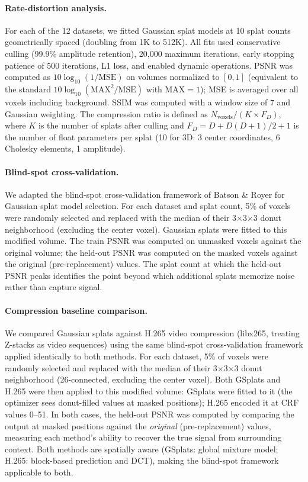 \paragraph{Rate-distortion analysis.}
For each of the 12 datasets, we fitted Gaussian splat models at 10 splat counts geometrically spaced (doubling from 1K to 512K).
All fits used conservative culling (99.9\% amplitude retention), 20,000 maximum iterations, early stopping patience of 500 iterations, L1 loss, and enabled dynamic operations.
PSNR was computed as $10 \log_{10}(1 / \text{MSE})$ on volumes normalized to $[0, 1]$ (equivalent to the standard $10\log_{10}(\text{MAX}^2/\text{MSE})$ with $\text{MAX} = 1$); MSE is averaged over all voxels including background.
SSIM\cite{wang2004image} was computed with a window size of 7 and Gaussian weighting.
The compression ratio is defined as $N_\text{voxels} / (K \times F_D)$, where $K$ is the number of splats after culling and $F_D = D + D(D{+}1)/2 + 1$ is the number of float parameters per splat (10 for 3D: 3 center coordinates, 6 Cholesky elements, 1 amplitude).

\paragraph{Blind-spot cross-validation.}
We adapted the blind-spot cross-validation framework of Batson \& Royer\cite{batson2019noise2self} for Gaussian splat model selection.
For each dataset and splat count, 5\% of voxels were randomly selected and replaced with the median of their 3$\times$3$\times$3 donut neighborhood (excluding the center voxel).
Gaussian splats were fitted to this modified volume.
The train PSNR was computed on unmasked voxels against the original volume; the held-out PSNR was computed on the masked voxels against the original (pre-replacement) values.
The splat count at which the held-out PSNR peaks identifies the point beyond which additional splats memorize noise rather than capture signal.

\paragraph{Compression baseline comparison.}
We compared Gaussian splats against H.265 video compression (libx265, treating Z-stacks as video sequences) using the same blind-spot cross-validation framework\cite{batson2019noise2self} applied identically to both methods.
For each dataset, 5\% of voxels were randomly selected and replaced with the median of their 3$\times$3$\times$3 donut neighborhood (26-connected, excluding the center voxel).
Both GSplats and H.265 were then applied to this modified volume: GSplats were fitted to it (the optimizer sees donut-filled values at masked positions); H.265 encoded it at CRF values 0--51.
In both cases, the held-out PSNR was computed by comparing the output at masked positions against the \emph{original} (pre-replacement) values, measuring each method's ability to recover the true signal from surrounding context.
Both methods are spatially aware (GSplats: global mixture model; H.265: block-based prediction and DCT), making the blind-spot framework applicable to both.

